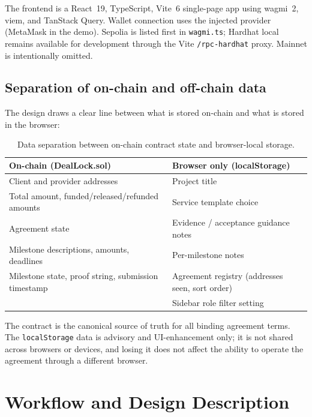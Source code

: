 \documentclass[12pt,a4paper]{article}
\begin{document}
The frontend is a React~19, TypeScript, Vite~6 single-page app using wagmi~2,
viem, and TanStack Query. Wallet connection uses the injected provider
(MetaMask in the demo). Sepolia is listed first in \texttt{wagmi.ts}; Hardhat
local remains available for development through the Vite \texttt{/rpc-hardhat}
proxy. Mainnet is intentionally omitted.

\subsection{Separation of on-chain and off-chain data}

The design draws a clear line between what is stored on-chain and what is stored
in the browser:

\begin{table}[H]
\centering
\small
\renewcommand{\arraystretch}{1.3}
\begin{tabular}{p{} p{}}
\toprule
\textbf{On-chain (DealLock.sol)} & \textbf{Browser only (localStorage)} \\
\midrule
Client and provider addresses & Project title \\
Total amount, funded/released/refunded amounts & Service template choice \\
Agreement state & Evidence / acceptance guidance notes \\
Milestone descriptions, amounts, deadlines & Per-milestone notes \\
Milestone state, proof string, submission timestamp & Agreement registry (addresses seen, sort order) \\
 & Sidebar role filter setting \\
\bottomrule
\end{tabular}
\caption{Data separation between on-chain contract state and browser-local storage.}
\label{tab:data}
\end{table}

The contract is the canonical source of truth for all binding agreement terms.
The \texttt{localStorage} data is advisory and UI-enhancement only; it is not
shared across browsers or devices, and losing it does not affect the ability to
operate the agreement through a different browser.

\newpage
\section{Workflow and Design Description}
\label{sec:workflow}
\end{document}
